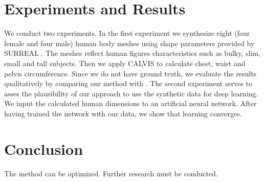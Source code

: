 \documentclass[10pt,twocolumn,letterpaper]{article}
\begin{document}
 

\section{Experiments and Results}

We conduct two experiments. In the first experiment we synthesize eight (four 
female and four male) human body meshes using shape parameters provided by 
SURREAL \cite{varol17_surreal}.
The meshes reflect human figures characteristics such as bulky, slim, small and 
tall subjects. Then we apply CALVIS to calculate chest, waist and pelvis 
circumference. Since we do not have ground truth, we evaluate the results 
qualitatively by comparing our method 
with \cite{Dibra.2016b}.
The second 
experiment serves to asses the plausibility of our approach to use the 
synthetic data for deep learning. We input the calculated human 
dimensions to an artificial neural network. After having trained the network 
with our data, we show that learning converges.


\section{Conclusion}

The method can be optimized. Further research must be conducted.

{\small


}
\end{document}
